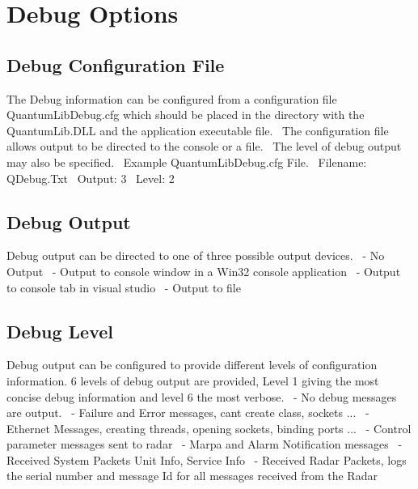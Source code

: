 \hypertarget{page4_Debug}{}\section{Debug Options}\label{page4_Debug}
\hypertarget{page4_File}{}\subsection{Debug Configuration File}\label{page4_File}
The Debug information can be configured from a configuration file Quantum\+Lib\+Debug.\+cfg which should be placed in the directory with the Quantum\+Lib.\+D\+LL and the application executable file.~\newline
The configuration file allows output to be directed to the console or a file.~\newline
The level of debug output may also be specified.~\newline
Example Quantum\+Lib\+Debug.\+cfg File.~\newline
Filename\+: Q\+Debug.\+Txt~\newline
Output\+: 3~\newline
Level\+: 2~\newline
\hypertarget{page4_Output}{}\subsection{Debug Output}\label{page4_Output}
Debug output can be directed to one of three possible output devices.~ -\/ No Output~ -\/ Output to console window in a Win32 console application~ -\/ Output to console tab in visual studio~ -\/ Output to file~\newline
\hypertarget{page4_Level}{}\subsection{Debug Level}\label{page4_Level}
Debug output can be configured to provide different levels of configuration information. 6 levels of debug output are provided, Level 1 giving the most concise debug information and level 6 the most verbose.~ -\/ No debug messages are output.~ -\/ Failure and Error messages, can\textquotesingle{}t create class, sockets ...~ -\/ Ethernet Messages, creating threads, opening sockets, binding ports ...~ -\/ Control parameter messages sent to radar~ -\/ Marpa and Alarm Notification messages~ -\/ Received System Packets Unit Info, Service Info~ -\/ Received Radar Packets, logs the serial number and message Id for all messages received from the Radar~\newline
 